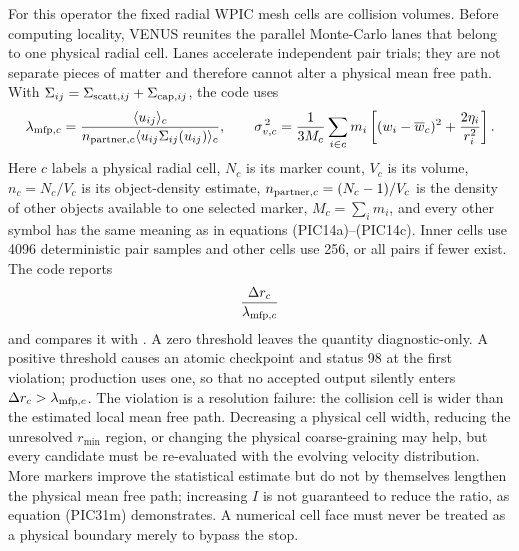 For this operator the fixed radial WPIC mesh cells are collision volumes.
Before computing locality, VENUS reunites the parallel Monte-Carlo lanes that
belong to one physical radial cell.  Lanes accelerate independent pair trials;
they are not separate pieces of matter and therefore cannot alter a physical
mean free path.  With
\(\Sigma_{ij}=\Sigma_{{\rm scatt},ij}+\Sigma_{{\rm cap},ij}\), the code uses
\[
 \lambda_{{\rm mfp},c}=
 \frac{\langle u_{ij}\rangle_c}
 {n_{{\rm partner},c}
  \langle u_{ij}\Sigma_{ij}(u_{ij})\rangle_c},\qquad
 \sigma_{v,c}^{\,2}=\frac{1}{3M_c}\sum_{i\in c}m_i
 \left[(w_i-\overline w_c)^2+\frac{2\eta_i}{r_i^2}\right].
\]
Here \(c\) labels a physical radial cell, \(N_c\) is its marker count,
\(V_c\) is its volume,
\(n_c=N_c/V_c\) is its object-density estimate,
\(n_{{\rm partner},c}=(N_c-1)/V_c\) is the density of other objects available
to one selected marker, \(M_c=\sum_i m_i\), and every other symbol has the
same meaning as in equations (PIC14a)--(PIC14c).  Inner cells use 4096
deterministic pair samples and other cells use 256, or all pairs if fewer
exist.  The code reports
\[
 \frac{\Delta r_c}{\lambda_{{\rm mfp},c}}
\]
and compares it with .  A zero
threshold leaves the quantity diagnostic-only.  A positive threshold causes
an atomic checkpoint and status 98 at the first violation; production uses
one, so that no accepted output silently enters
\(\Delta r_c>\lambda_{{\rm mfp},c}\).  The violation is a resolution failure:
the collision cell is wider than the estimated local mean free path.
Decreasing a physical cell width, reducing the unresolved \(r_{\min}\)
region, or changing the physical coarse-graining may help, but every candidate
must be re-evaluated with the evolving velocity distribution.  More markers
improve the statistical estimate but do not by themselves lengthen the
physical mean free path; increasing \(I\) is not guaranteed to reduce the
ratio, as equation (PIC31m) demonstrates.  A numerical cell face must never
be treated as a physical boundary merely to bypass the stop.

